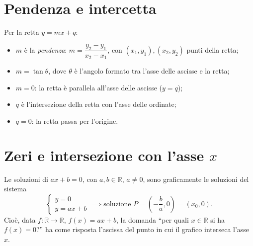 \documentclass[11pt,a4paper]{article}
\begin{document}
\section{Pendenza e intercetta}

Per la retta $y = mx + q$:
\begin{itemize}
    \item $m$ è la \emph{pendenza}: $m = \dfrac{y_2 - y_1}{x_2 - x_1}$, con $(x_1, y_1), (x_2, y_2)$ punti della retta;
    \item $m = \tan\theta$, dove $\theta$ è l'angolo formato tra l'asse delle ascisse e la retta;
    \item $m = 0$: la retta è parallela all'asse delle ascisse ($y = q$);
    \item $q$ è l'intersezione della retta con l'asse delle ordinate;
    \item $q = 0$: la retta passa per l'origine.
\end{itemize}

\section{Zeri e intersezione con l'asse $x$}

Le soluzioni di $ax + b = 0$, con $a, b \in \mathbb{R}$, $a \neq 0$, sono graficamente le soluzioni del sistema
\[
\begin{cases} y = 0 \\ y = ax + b \end{cases}
\implies \text{soluzione } P = \left(-\frac{b}{a}, 0\right) = (x_0, 0).
\]
Cioè, data $f : \mathbb{R} \to \mathbb{R}$, $f(x) = ax + b$, la domanda ``per quali $x \in \mathbb{R}$ si ha $f(x) = 0$?'' ha come risposta l'ascissa del punto in cui il grafico interseca l'asse $x$.
\end{document}
